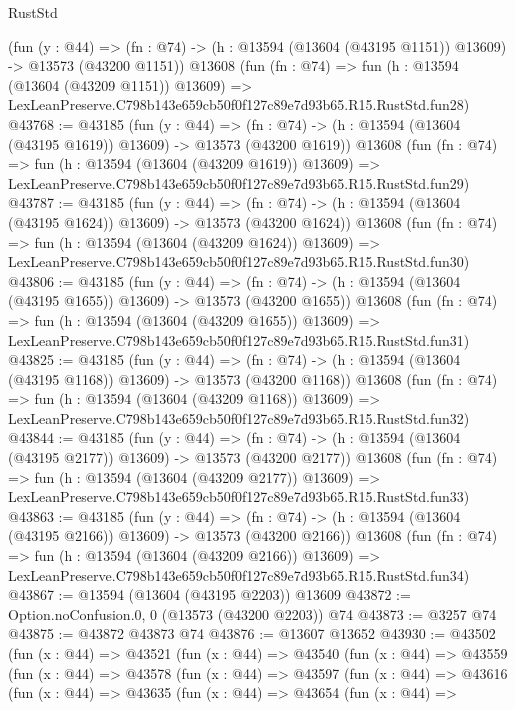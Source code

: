 \begin{lexlean}{RustStd}
\begin{coremodule}
    (fun (y : @44) =>
    (fn : @74) -> (h : @13594 (@13604 (@43195 @1151)) @13609) -> @13573 (@43200 @1151))
    @13608
    (fun (fn : @74) =>
    fun (h : @13594 (@13604 (@43209 @1151)) @13609) =>
    LexLeanPreserve.C798b143e659cb50f0f127c89e7d93b65.R15.RustStd.fun28)
@43768 := @43185
    (fun (y : @44) =>
    (fn : @74) -> (h : @13594 (@13604 (@43195 @1619)) @13609) -> @13573 (@43200 @1619))
    @13608
    (fun (fn : @74) =>
    fun (h : @13594 (@13604 (@43209 @1619)) @13609) =>
    LexLeanPreserve.C798b143e659cb50f0f127c89e7d93b65.R15.RustStd.fun29)
@43787 := @43185
    (fun (y : @44) =>
    (fn : @74) -> (h : @13594 (@13604 (@43195 @1624)) @13609) -> @13573 (@43200 @1624))
    @13608
    (fun (fn : @74) =>
    fun (h : @13594 (@13604 (@43209 @1624)) @13609) =>
    LexLeanPreserve.C798b143e659cb50f0f127c89e7d93b65.R15.RustStd.fun30)
@43806 := @43185
    (fun (y : @44) =>
    (fn : @74) -> (h : @13594 (@13604 (@43195 @1655)) @13609) -> @13573 (@43200 @1655))
    @13608
    (fun (fn : @74) =>
    fun (h : @13594 (@13604 (@43209 @1655)) @13609) =>
    LexLeanPreserve.C798b143e659cb50f0f127c89e7d93b65.R15.RustStd.fun31)
@43825 := @43185
    (fun (y : @44) =>
    (fn : @74) -> (h : @13594 (@13604 (@43195 @1168)) @13609) -> @13573 (@43200 @1168))
    @13608
    (fun (fn : @74) =>
    fun (h : @13594 (@13604 (@43209 @1168)) @13609) =>
    LexLeanPreserve.C798b143e659cb50f0f127c89e7d93b65.R15.RustStd.fun32)
@43844 := @43185
    (fun (y : @44) =>
    (fn : @74) -> (h : @13594 (@13604 (@43195 @2177)) @13609) -> @13573 (@43200 @2177))
    @13608
    (fun (fn : @74) =>
    fun (h : @13594 (@13604 (@43209 @2177)) @13609) =>
    LexLeanPreserve.C798b143e659cb50f0f127c89e7d93b65.R15.RustStd.fun33)
@43863 := @43185
    (fun (y : @44) =>
    (fn : @74) -> (h : @13594 (@13604 (@43195 @2166)) @13609) -> @13573 (@43200 @2166))
    @13608
    (fun (fn : @74) =>
    fun (h : @13594 (@13604 (@43209 @2166)) @13609) =>
    LexLeanPreserve.C798b143e659cb50f0f127c89e7d93b65.R15.RustStd.fun34)
@43867 := @13594 (@13604 (@43195 @2203)) @13609
@43872 := Option.noConfusion.{0, 0} (@13573 (@43200 @2203)) @74
@43873 := @3257 @74
@43875 := @43872 @43873 @74
@43876 := @13607 @13652
@43930 := @43502
    (fun (x : @44) =>
    @43521
      (fun (x : @44) =>
      @43540
        (fun (x : @44) =>
        @43559
          (fun (x : @44) =>
          @43578
            (fun (x : @44) =>
            @43597
              (fun (x : @44) =>
              @43616
                (fun (x : @44) =>
                @43635
                  (fun (x : @44) =>
                  @43654
                    (fun (x : @44) =>

\end{coremodule}
\end{lexlean}
